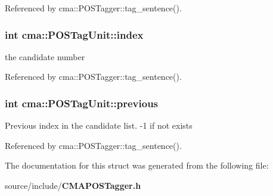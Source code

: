 Referenced by cma::POSTagger::tag\_\-sentence().
\subsubsection{\setlength{\rightskip}{0pt plus 5cm}int {\bf cma::POSTagUnit::index}}\label{structcma_1_1POSTagUnit_982a3b0932a72ce0a96de0bb24f6d849}


the candidate number 

Referenced by cma::POSTagger::tag\_\-sentence().
\subsubsection{\setlength{\rightskip}{0pt plus 5cm}int {\bf cma::POSTagUnit::previous}}\label{structcma_1_1POSTagUnit_f11c0faeb5fb6c58348768403a9714a9}


Previous index in the candidate list. -1 if not exists 

Referenced by cma::POSTagger::tag\_\-sentence().

The documentation for this struct was generated from the following file:\begin{CompactItemize}
\item 
source/include/{\bf CMAPOSTagger.h}\end{CompactItemize}
